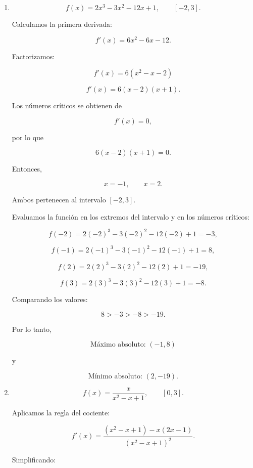\documentclass[12pt]{article}
\begin{document}
\begin{enumerate}[label=\alph*.-]
\begin{enumerate}[label=\roman*.-]
    \item
    \[
    f(x)=2x^3-3x^2-12x+1,
    \qquad [-2,3].
    \]

    Calculamos la primera derivada:

    \[
    f'(x)=6x^2-6x-12.
    \]

    Factorizamos:

    \[
    f'(x)=6(x^2-x-2)
    \]

    \[
    f'(x)=6(x-2)(x+1).
    \]

    Los números críticos se obtienen de

    \[
    f'(x)=0,
    \]

    por lo que

    \[
    6(x-2)(x+1)=0.
    \]

    Entonces,

    \[
    x=-1,\qquad x=2.
    \]

    Ambos pertenecen al intervalo $[-2,3]$.

    Evaluamos la función en los extremos del intervalo y en los
    números críticos:

    \[
    f(-2)
    =
    2(-2)^3-3(-2)^2-12(-2)+1
    =
    -3,
    \]

    \[
    f(-1)
    =
    2(-1)^3-3(-1)^2-12(-1)+1
    =
    8,
    \]

    \[
    f(2)
    =
    2(2)^3-3(2)^2-12(2)+1
    =
    -19,
    \]

    \[
    f(3)
    =
    2(3)^3-3(3)^2-12(3)+1
    =
    -8.
    \]

    Comparando los valores:

    \[
    8>-3>-8>-19.
    \]

    Por lo tanto,

    \[
    \boxed{
    \text{Máximo absoluto: }(-1,8)
    }
    \]

    y

    \[
    \boxed{
    \text{Mínimo absoluto: }(2,-19)
    }.
    \]



    \item
    \[
    f(x)=\frac{x}{x^2-x+1},
    \qquad [0,3].
    \]

    Aplicamos la regla del cociente:

    \[
    f'(x)
    =
    \frac{(x^2-x+1)-x(2x-1)}
    {(x^2-x+1)^2}.
    \]

    Simplificando:


\end{enumerate}
\end{enumerate}
\end{document}
